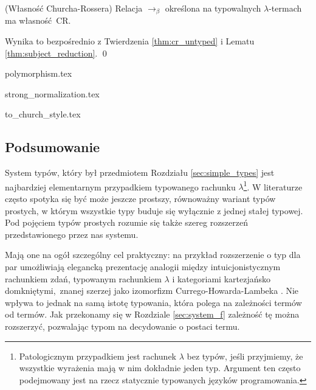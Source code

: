\begin{twierdzenie}(Własność Churcha-Rossera)
  Relacja \(\to_\beta\) określona na typowalnych \(\lambda\)-termach  ma własność CR.
\end{twierdzenie}
\begin{dowod}
  Wynika to bezpośrednio z Twierdzenia \ref{thm:cr_untyped} i Lematu \ref{thm:subject_reduction}. \qed
\end{dowod}

{polymorphism.tex}

{strong_normalization.tex}

{to_church_style.tex}
\subsection{Podsumowanie}
System typów, który był przedmiotem Rozdziału \ref{sec:simple_types} jest najbardziej elementarnym przypadkiem typowanego rachunku \(\lambda\)\footnote{Patologicznym przypadkiem jest rachunek \(\lambda\) bez typów, jeśli przyjmiemy, że wszystkie wyrażenia mają w nim dokładnie jeden typ. Argument ten często podejmowany jest na rzecz statycznie typowanych języków programowania.}. W literaturze często spotyka się być może jeszcze prostszy, równoważny wariant typów prostych, w którym wszystkie typy buduje się wyłącznie z jednej stałej typowej. Pod pojęciem typów prostych rozumie się także szereg rozszerzeń przedstawionego przez nas systemu.%

Mają one na ogół szczególny cel praktyczny: na przykład rozszerzenie o typ dla par umożliwiają elegancką prezentację analogii między intuicjonistycznym rachunkiem zdań, typowanym rachunkiem \(\lambda\) i kategoriami kartezjańsko domkniętymi, znanej szerzej jako izomorfizm Currego-Howarda-Lambeka \cite[Rozdział 3.1]{Girard:1989:PT:64805}. Nie wpływa to jednak na samą istotę typowania, która polega na zależności termów od termów. Jak przekonamy się w Rozdziale \ref{sec:system_f} zależność tę można rozszerzyć, pozwalając typom na decydowanie o postaci termu. 
